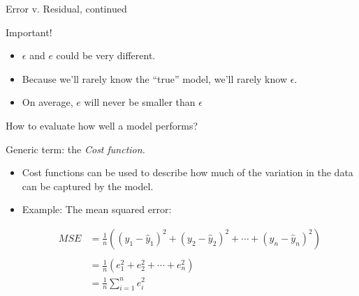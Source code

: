 \documentclass[aspectratio=169]{beamer}
\begin{document}
\begin{frame}{Error v. Residual, continued}

Important!  
\begin{itemize}
\item $\epsilon$ and $e$ could be very different.  
\item Because we'll rarely know the ``true'' model, we'll rarely know $\epsilon$.
\item On average, $e$ will never be smaller than $\epsilon$
\end{itemize}
\end{frame}

\begin{frame}{How to evaluate how well a model performs?}

Generic term: the \textit{Cost function.}

\begin{itemize}
\item Cost functions can be used to describe how much of the variation in the data can be captured by the model.
\item Example: The mean squared error:

\begin{align*}
MSE &= \frac{1}{n} ((y_1 - \hat{y}_1)^2 + (y_2 - \hat{y}_2)^2 + \cdots + (y_n - \hat{y}_n)^2) \\\\
&= \frac{1}{n} (e_1^2 + e_2^2 + \cdots + e_n^2) \\
&=\frac{1}{n} \sum_{i=1}^n e_i^2
\end{align*}
\end{itemize}

\end{frame}
\end{document}

